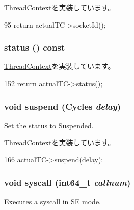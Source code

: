 \hyperlink{classThreadContext_aba2c497e8af03f742e5ece80efaeb197}{ThreadContext}を実装しています。


\begin{DoxyCode}
95 { return actualTC->socketId(); }
\end{DoxyCode}
\hypertarget{classCheckerThreadContext_a2ad9e92a82d6f783b3061584729c2f4a}{
\subsubsection[{status}]{ status () const}}
\label{classCheckerThreadContext_a2ad9e92a82d6f783b3061584729c2f4a}


\hyperlink{classThreadContext_adfba9b39542cba955a02b8ff3ba023a9}{ThreadContext}を実装しています。


\begin{DoxyCode}
152 { return actualTC->status(); }
\end{DoxyCode}
\hypertarget{classCheckerThreadContext_a197ef8a0b017208563e0a899c69559e8}{
\subsubsection[{suspend}]{\setlength{\rightskip}{0pt plus 5cm}void suspend ({\bf Cycles} {\em delay})}}
\label{classCheckerThreadContext_a197ef8a0b017208563e0a899c69559e8}


\hyperlink{classSet}{Set} the status to Suspended. 

\hyperlink{classThreadContext_af2ae27d19d77b0301484ac488d97d37b}{ThreadContext}を実装しています。


\begin{DoxyCode}
166 { actualTC->suspend(delay); }
\end{DoxyCode}
\hypertarget{classCheckerThreadContext_a36e0b96120fcbbc2ee8699158f7be5c2}{
\subsubsection[{syscall}]{\setlength{\rightskip}{0pt plus 5cm}void syscall (int64\_\-t {\em callnum})}}
\label{classCheckerThreadContext_a36e0b96120fcbbc2ee8699158f7be5c2}
Executes a syscall in SE mode. 

